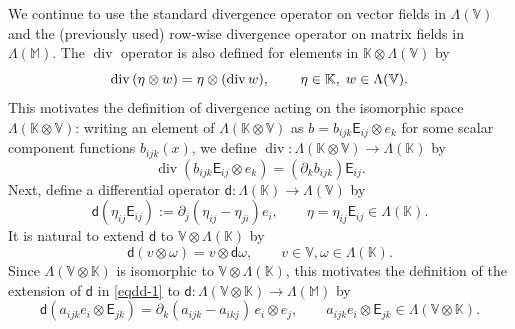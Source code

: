 \documentclass[12pt]{amsart}
\numberwithin{equation}{section}
\DeclareMathOperator{\divg}{div}
\theoremstyle{definition}
\theoremstyle{remark}
\newcommand{\V}{\mathbb{V}}
\newcommand{\M}{\mathbb{M}}
\newcommand{\K}{\mathbb{K}}
\renewcommand{\(}{\bigl(}
\renewcommand{\)}{\bigr)}
\newcommand{\EK}{\mathsf{E}}
\newcommand{\dd}{\mathsf{d}}
\newcommand{\dive}{{\ensuremath\mathop{\mathrm{div}\,}}} %
\newcommand{\revj}[1]{{\color{black}#1}}
\begin{document}
We continue to use the standard divergence operator on vector fields
in $\Lambda(\V)$ and the (previously used) row-wise divergence
operator on matrix fields in $\Lambda(\M)$. The \revj{ $\divg$ operator is also defined for elements in}   $\K \otimes \Lambda(\V)$ by 
\begin{equation*}
  \dive( \eta\otimes w )= \eta \otimes (\dive w),\, \qquad
  \eta \in \K, \;
  w \in \Lambda(\V).
\end{equation*}
This motivates the \revj{ definition of divergence acting on} the isomorphic
space $\Lambda( \K \otimes \V)$: writing an element of
$\Lambda( \K \otimes \V)$ as $b = b_{ijk} \EK_{ij} \otimes e_k$ for
some scalar component functions $b_{ijk}(x)$, we define
$\divg : \Lambda( \K \otimes \V) \to \Lambda(\K)$ by
\begin{equation}
  \label{eq:div-KV}
  \divg (b_{ijk} \EK_{ij} \otimes e_k) = (\partial_k b_{ijk}) \EK_{ij}.
\end{equation}
Next, define a differential operator
$\dd: \Lambda(\K) \rightarrow   \Lambda(\V)$ by
\begin{equation}
  \label{eqdd-1}
\dd(\eta_{ij} \EK_{ij}):= \partial_{j}
(\eta_{ij} -\eta_{ji}) e_i, \qquad \eta = \eta_{ij} \EK_{ij} \in \Lambda(\K).
\end{equation}
It is natural to extend $\dd$ to $\V \otimes \Lambda(\K)$ by
\begin{equation*}
  \dd(v \otimes \omega )=  v \otimes \dd \omega, \qquad v \in \V,
  \omega \in \Lambda(\K).
\end{equation*}
Since $\Lambda( \V \otimes \K)$ is isomorphic to
$\V \otimes \Lambda(\K)$, this motivates the definition of the
extension of $\dd$ in \eqref{eqdd-1} to
$\dd : \Lambda( \V \otimes \K) \to \Lambda(\M)$ by
\begin{equation}
  \label{eq:dd-2}
  \dd ( a_{ijk} e_i \otimes \EK_{jk}) = \partial_k( a_{ijk} - a_{ikj}) \,
  e_i \otimes e_j,
  \qquad  a_{ijk} e_i \otimes \EK_{jk}\in \Lambda(\V \otimes \K).  
\end{equation}
\end{document}
